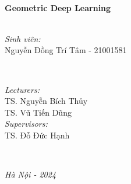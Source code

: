 \begin{titlepage}
\HRule \\[0.4cm]
{ \large \bfseries Geometric Deep Learning
 }\\[0.4cm] 
\HRule \\[1.5cm]
 

\begin{minipage}{0.475\textwidth}
\vspace{-2cm}
\begin{flushleft} \large
\emph{Sinh viên:}\\
Nguyễn Đồng Trí Tâm - 21001581 \\
\end{flushleft}
\end{minipage}
~
\begin{minipage}{0.495\textwidth}
\begin{flushleft} \large
\hspace{1cm}\emph{Lecturers:} \\
\hspace{2cm}TS. Nguyễn Bích Thủy\\
\hspace{2cm}TS. Vũ Tiến Dũng\\
\hspace{1cm}\emph{Supervisors:} \\
\hspace{2cm}TS. Đỗ Đức Hạnh\\



\end{flushleft}
\end{minipage}\\[2cm]





\vfill 
\centerline{\large \sl Hà Nội - 2024}
\end{titlepage}

